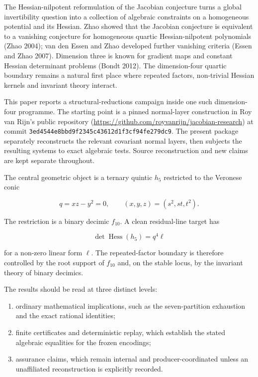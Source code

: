 \documentclass[
  11pt,
]{article}
\providecommand{\tightlist}{%
  \setlength{\itemsep}{0pt}\setlength{\parskip}{0pt}}
\begin{document}
The Hessian-nilpotent reformulation of the Jacobian conjecture turns a
global invertibility question into a collection of algebraic constraints
on a homogeneous potential and its Hessian. Zhao showed that the
Jacobian conjecture is equivalent to a vanishing conjecture for
homogeneous quartic Hessian-nilpotent polynomials (Zhao 2004); van den
Essen and Zhao developed further vanishing criteria (Essen and Zhao
2007). Dimension three is known for gradient maps and constant Hessian
determinant problems (Bondt 2012). The dimension-four quartic boundary
remains a natural first place where repeated factors, non-trivial
Hessian kernels and invariant theory interact.

This paper reports a structural-reductions campaign inside one such
dimension-four programme. The starting point is a pinned normal-layer
construction in Roy van Rijn's public repository
(\url{https://github.com/royvanrijn/jacobian-research}) at commit
\texttt{3ed4544e8bbd9f2345c43612d1f3cf94fe279dc9}. The present package
separately reconstructs the relevant covariant normal layers, then
subjects the resulting systems to exact algebraic tests. Source
reconstruction and new claims are kept separate throughout.

The central geometric object is a ternary quintic \(h_5\) restricted to
the Veronese conic

\[
q=xz-y^2=0,\qquad (x,y,z)=(s^2,st,t^2).
\]

The restriction is a binary decimic \(f_{10}\). A clean residual-line
target has

\[
\det\operatorname{Hess}(h_5)=q^4\ell
\tag{1.1}
\]

for a non-zero linear form \(\ell\). The repeated-factor boundary is
therefore controlled by the root support of \(f_{10}\) and, on the
stable locus, by the invariant theory of binary decimics.

The results should be read at three distinct levels:

\begin{enumerate}
\def\labelenumi{\arabic{enumi}.}
\tightlist
\item
  ordinary mathematical implications, such as the seven-partition
  exhaustion and the exact rational identities;
\item
  finite certificates and deterministic replay, which establish the
  stated algebraic equalities for the frozen encodings;
\item
  assurance claims, which remain internal and producer-coordinated
  unless an unaffiliated reconstruction is explicitly recorded.
\end{enumerate}
\end{document}
